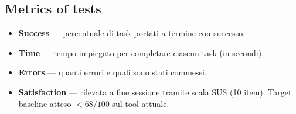\documentclass[11pt,a4paper]{article}
\begin{document}
\subsection*{Metrics of tests \normalfont\small\itshape}
\begin{itemize}[leftmargin=*,itemsep=3pt]
  \item \textbf{Success} --- percentuale di task portati
  a termine con successo.
  \item \textbf{Time} --- tempo impiegato per completare
  ciascun task (in secondi).
  \item \textbf{Errors} --- quanti errori e quali sono stati commessi.
  \item \textbf{Satisfaction} --- rilevata a fine sessione
  tramite scala SUS (10 item). Target baseline atteso
  $< 68/100$ sul tool attuale.
\end{itemize}

\vspace{0.2cm}
\end{document}
